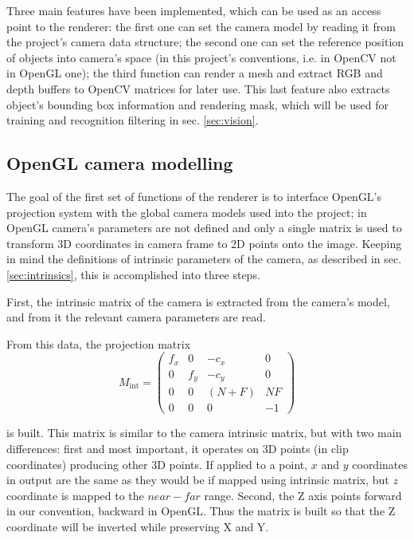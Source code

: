 Three main features have been implemented, which can be used as an access point
to the renderer: the first one can set the
camera model by reading it from the project's camera data structure; the second
one can set the reference position of objects into camera's space (in this project's
conventions, i.e. in OpenCV not in OpenGL one); the third function can render a
mesh and extract RGB and depth buffers to OpenCV matrices for later use. This
last feature also extracts object's bounding box information and rendering mask,
which will be used for training and recognition filtering in sec.
\ref{sec:vision}.

\subsection{OpenGL camera modelling}
The goal of the first set of functions of the renderer is to interface OpenGL's
projection system with the global camera models used into the project; in
OpenGL camera's parameters are not defined and only a single matrix is used to
transform 3D coordinates in camera frame to 2D points onto the image. Keeping in
mind the definitions of intrinsic parameters of the camera, as described in sec.
\ref{sec:intrinsics}, this is accomplished into three steps.

First, the intrinsic matrix of the camera is extracted from the
camera's model, and from it the relevant camera parameters are read.

From this data, the projection matrix 
\begin{equation}
  M_{\text{int}}=\begin{pmatrix}
    f_x & 0 & -c_x & 0\\
    0 & f_y & -c_y & 0\\
    0 & 0 & (N+F) & NF \\
    0 & 0 & 0 & -1 
  \end{pmatrix}
\end{equation}

is built. This matrix is similar to the camera intrinsic matrix, but with two
main differences: first and most important, it operates on 3D points (in clip
coordinates) producing
other 3D points. If applied to a point, $x$ and $y$ coordinates in output are the same as they would be
if mapped using intrinsic matrix, but $z$ coordinate is mapped to the $near-far$
range. Second, the Z axis points forward in our convention, backward in OpenGL.
Thus the matrix is built so that the Z coordinate will be inverted while
preserving X and Y.

